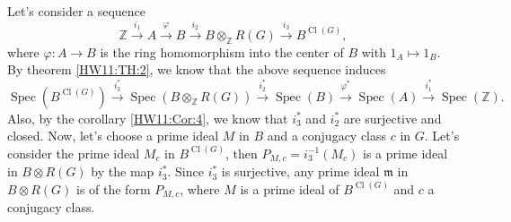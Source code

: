 \documentclass[a4paper, 12pt]{article}
\theoremstyle{Mydefinition}
\theoremstyle{Mytheorem}
\DeclareMathOperator{\cl}{Cl}
\DeclareMathOperator{\Spec}{Spec}
\begin{document}
Let's consider a sequence
\begin{equation}
    \mathbb{Z}\xrightarrow{i_1} A\xrightarrow{\varphi} B\xrightarrow{i_2}B\otimes_{\mathbb{Z}} R(G)\xrightarrow{i_3}B^{\cl(G)},
\end{equation}
where $\varphi:A\rightarrow B$ is the ring homomorphism into the center of $B$ with $1_A\mapsto 1_B$. By theorem \ref{HW11:TH:2}, we know that the above sequence induces
\begin{equation}
    \Spec(B^{\cl(G)})\xrightarrow{i^*_3}\Spec(B\otimes_{\mathbb{Z}} R(G))\xrightarrow{i^*_2}\Spec(B)\xrightarrow{\varphi^*}\Spec(A)\xrightarrow{i_1^*}\Spec(\mathbb{Z}).
\end{equation}
Also, by the corollary \ref{HW11:Cor:4}, we know that $i_3^*$ and $i_2^*$ are surjective and closed. Now, let's choose a prime ideal $M$ in $B$ and a conjugacy class $c$ in $G$. Let's consider the prime ideal $M_c$ in $B^{\cl (G)}$, then $P_{M,c} = i_3^{-1}(M_c)$ is a prime ideal in $B\otimes R(G)$ by the map $i_3^*$. Since $i_3^*$ is surjective, any prime ideal $\mathfrak{m}$ in $B\otimes R(G)$ is of the form $P_{M,c}$, where $M$ is a prime ideal of $B^{\cl(G)}$ and $c$ a conjugacy class.
\end{document}
